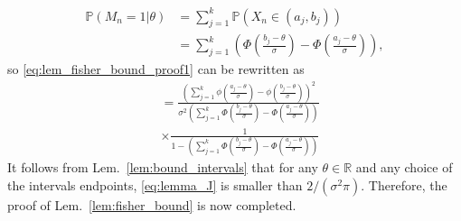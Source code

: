 \documentclass[letterpaper, conference]{IEEEtran}      %
\begin{document}
\begin{align*}
\mathbb P(M_n=1| \theta) & = \sum_{j=1}^k \mathbb P\left(X_n \in (a_j,b_j) \right)  \\
& = \sum_{j=1}^k \left( \Phi \left(\frac{b_j-\theta}{\sigma} \right) -  \Phi \left(\frac{a_j-\theta}{\sigma} \right)  \right),
\end{align*}
so \eqref{eq:lem_fisher_bound_proof1} can be rewritten as
\begin{align}
& =   \frac { \left( \sum_{j=1}^{k} \phi \left(\frac{a_j-\theta}{\sigma} \right) - \phi \left( \frac{b_j-\theta} {\sigma} \right)  \right)^2 } 
{\sigma^2 \left( \sum_{j=1}^k \Phi \left( \frac{b_j-\theta }{\sigma}\right) - \Phi \left( \frac{a_j-\theta }{\sigma}\right)  \right) }  \nonumber \\
& \times \frac {1} 
{1- \left( \sum_{j=1}^k \Phi \left( \frac{b_j-\theta }{\sigma}\right) - \Phi \left( \frac{a_j-\theta }{\sigma}\right)  \right) } 
\label{eq:lemma_J}
\end{align}
It follows from Lem.~\ref{lem:bound_intervals} that for any $\theta \in \mathbb R$ and any choice of the intervals endpoints, \eqref{eq:lemma_J} is smaller than $2/(\sigma^2 \pi)$. Therefore, the proof of  Lem.~\ref{lem:fisher_bound} is now completed.




\end{document}
